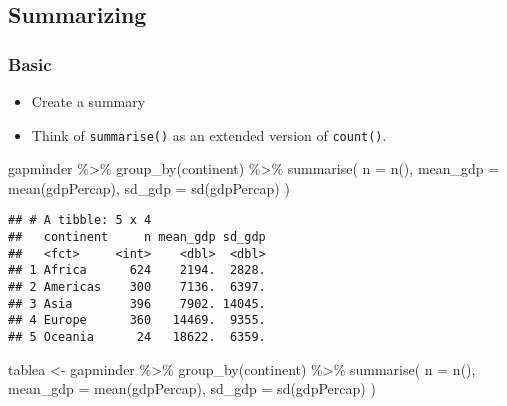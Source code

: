 \documentclass[
]{book}
\newenvironment{Shaded}{\begin{snugshade}}{\end{snugshade}}
\newcommand{\AttributeTok}[1]{\textcolor[rgb]{0.77,0.63,0.00}{#1}}
\newcommand{\FunctionTok}[1]{\textcolor[rgb]{0.00,0.00,0.00}{#1}}
\newcommand{\NormalTok}[1]{#1}
\newcommand{\OtherTok}[1]{\textcolor[rgb]{0.56,0.35,0.01}{#1}}
\newcommand{\SpecialCharTok}[1]{\textcolor[rgb]{0.00,0.00,0.00}{#1}}
\providecommand{\tightlist}{%
  \setlength{\itemsep}{0pt}\setlength{\parskip}{0pt}}
\begin{document}
\hypertarget{summarizing}{%
\subsection{Summarizing}\label{summarizing}}

\hypertarget{basic}{%
\subsubsection{Basic}\label{basic}}

\begin{itemize}
\tightlist
\item
  Create a summary
\item
  Think of \texttt{summarise()} as an extended version of \texttt{count()}.
\end{itemize}

\begin{Shaded}
\begin{Highlighting}[]
\NormalTok{gapminder }\SpecialCharTok{\%\textgreater{}\%}
  \FunctionTok{group\_by}\NormalTok{(continent) }\SpecialCharTok{\%\textgreater{}\%}
  \FunctionTok{summarise}\NormalTok{(}
    \AttributeTok{n =} \FunctionTok{n}\NormalTok{(),}
    \AttributeTok{mean\_gdp =} \FunctionTok{mean}\NormalTok{(gdpPercap),}
    \AttributeTok{sd\_gdp =} \FunctionTok{sd}\NormalTok{(gdpPercap)}
\NormalTok{  )}
\end{Highlighting}
\end{Shaded}

\begin{verbatim}
## # A tibble: 5 x 4
##   continent     n mean_gdp sd_gdp
##   <fct>     <int>    <dbl>  <dbl>
## 1 Africa      624    2194.  2828.
## 2 Americas    300    7136.  6397.
## 3 Asia        396    7902. 14045.
## 4 Europe      360   14469.  9355.
## 5 Oceania      24   18622.  6359.
\end{verbatim}

\begin{Shaded}
\begin{Highlighting}[]
\NormalTok{tablea }\OtherTok{\textless{}{-}}\NormalTok{ gapminder }\SpecialCharTok{\%\textgreater{}\%}
  \FunctionTok{group\_by}\NormalTok{(continent) }\SpecialCharTok{\%\textgreater{}\%}
  \FunctionTok{summarise}\NormalTok{(}
    \AttributeTok{n =} \FunctionTok{n}\NormalTok{(),}
    \AttributeTok{mean\_gdp =} \FunctionTok{mean}\NormalTok{(gdpPercap),}
    \AttributeTok{sd\_gdp =} \FunctionTok{sd}\NormalTok{(gdpPercap)}
\NormalTok{  )}
\end{Highlighting}
\end{Shaded}
\end{document}
